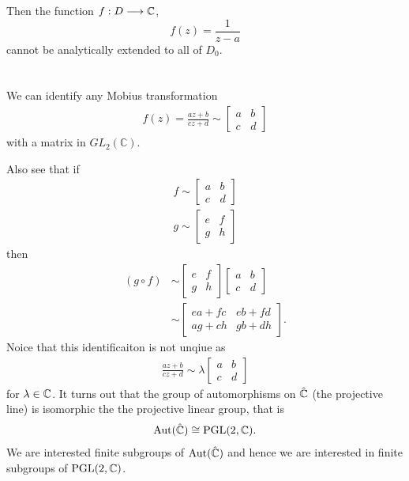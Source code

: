 \documentclass{unswmaths}
\begin{document}
Then the function $ f : D \longrightarrow \mathbb{C} $, $$ f(z) = \frac{1}{z-a} $$ cannot be analytically extended to all of $ D_0 $. 


\section{}

We can identify any Mobius transformation 
\begin{align}
    f(z) = \frac{az + b}{cz + d} \sim \left[ \begin{array}{cc} a & b \\ c & d \end{array}\right]
\end{align}
with a matrix in $ GL_2(\mathbb{C}) $.

Also see that if
\begin{align}
    f \sim \left[ \begin{array}{cc} a & b \\ c & d \end{array}\right] \\
    g \sim \left[ \begin{array}{cc} e & f \\ g & h \end{array}\right] 
\end{align}
then
\begin{align}
    (g \circ f) &\sim \left[ \begin{array}{cc} e & f \\ g & h \end{array}\right] \left[ \begin{array}{cc} a & b \\ c & d \end{array} \right] \\
    &\sim \left[ \begin{array}{cc} ea + fc & eb + fd \\ ag + ch & gb + dh\end{array}\right].
\end{align}
Noice that this identificaiton is not unqiue as
\begin{align}
    \frac{az + b}{cz+d} \sim \lambda\left[ \begin{array}{cc} a & b \\ c & d \end{array}\right]
\end{align}
for $ \lambda \in \mathbb{C} $.
It turns out that the group of automorphisms on $ \hat{\mathbb{C}} $ (the projective line) is isomorphic the the projective linear group, that is
\begin{align}
    \operatorname{Aut}(\hat{\mathbb{C}}) \cong \operatorname{PGL}(2,\mathbb{C}).
\end{align}
We are interested finite subgroups of $ \operatorname{Aut}(\hat{\mathbb{C}}) $ and hence we are interested in finite subgroups of $ \operatorname{PGL}(2, \mathbb{C}) $.
\end{document}
